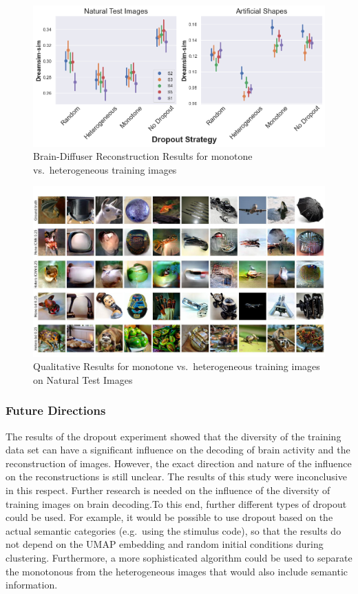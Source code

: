 \begin{figure}[ht]
  \centering
  \includegraphics[width=1\textwidth]{plots/dropout_discussion_reconstruction_bd.png}
  \caption{Brain-Diffuser Reconstruction Results for monotone vs.\ heterogeneous training images}\label{fig:dropout_discussion_reconstruction_bd}
\end{figure}

\begin{figure}[ht]
  \centering
  \includegraphics[width=1\textwidth]{plots/dropout_discussion_test.JPEG}
  \caption{Qualitative Results for monotone vs.\ heterogeneous training images on Natural Test Images}\label{fig:dropout_discussion_test}
\end{figure}

\subsubsection{Future Directions}

The results of the dropout experiment showed that the diversity of the training data set can have a significant influence on the decoding of brain activity and the reconstruction of images. However, the exact direction and nature of the influence on the  reconstructions is still unclear. The results of this study were inconclusive in this respect. Further research is needed on the influence of the diversity of training images on brain decoding.To this end, further different types of dropout could be used. For example, it would be possible to use dropout based on the actual semantic categories (e.g.\ using the stimulus code), so that the results do not depend on the UMAP embedding and random initial conditions during clustering. Furthermore, a more sophisticated algorithm could be used to separate the monotonous from the heterogeneous images that would also include semantic information. 


